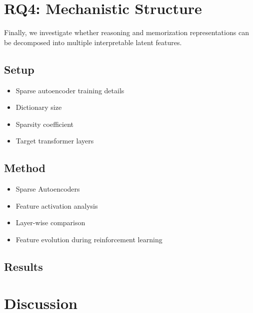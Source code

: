\documentclass[11pt]{article}
\begin{document}


\section{RQ4: Mechanistic Structure}

Finally, we investigate whether reasoning and memorization
representations can be decomposed into multiple interpretable latent
features.

\subsection{Setup}

\begin{itemize}

    \item Sparse autoencoder training details
    \item Dictionary size
    \item Sparsity coefficient
    \item Target transformer layers

\end{itemize}

\subsection{Method}

\begin{itemize}

    \item Sparse Autoencoders
    \item Feature activation analysis
    \item Layer-wise comparison
    \item Feature evolution during reinforcement learning

\end{itemize}

\subsection{Results}




\section{Discussion}
\end{document}
